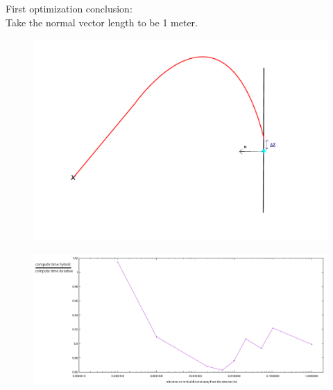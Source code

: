 \documentclass{beamer}
\begin{document}
\begin{frame}
	First optimization conclusion:\\ Take the normal vector length to be 1 meter.
\end{frame}
\begin{frame}
	\begin{figure}
		\includegraphics[width=\textwidth]{figures/PrincipleIllu.pdf}
	\end{figure}
\end{frame}
\begin{frame}
	\begin{figure}
		\includegraphics[width=\textwidth]{figures/ZtolVsTime2.pdf}
	\end{figure}
\end{frame}
\end{document}
